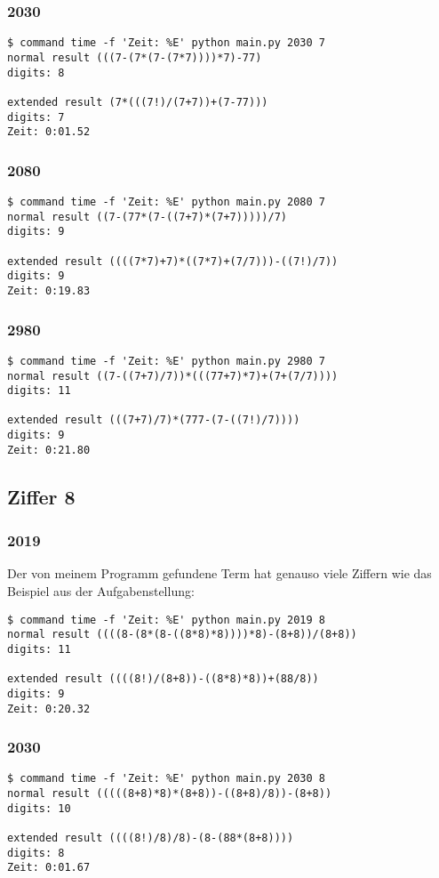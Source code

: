 \subsubsection{2030}
\begin{lstlisting}
$ command time -f 'Zeit: %E' python main.py 2030 7
normal result (((7-(7*(7-(7*7))))*7)-77)
digits: 8

extended result (7*(((7!)/(7+7))+(7-77)))
digits: 7
Zeit: 0:01.52
\end{lstlisting}
\subsubsection{2080}
\begin{lstlisting}
$ command time -f 'Zeit: %E' python main.py 2080 7
normal result ((7-(77*(7-((7+7)*(7+7)))))/7)
digits: 9

extended result ((((7*7)+7)*((7*7)+(7/7)))-((7!)/7))
digits: 9
Zeit: 0:19.83
\end{lstlisting}
\subsubsection{2980}
\begin{lstlisting}
$ command time -f 'Zeit: %E' python main.py 2980 7
normal result ((7-((7+7)/7))*(((77+7)*7)+(7+(7/7))))
digits: 11

extended result (((7+7)/7)*(777-(7-((7!)/7))))
digits: 9
Zeit: 0:21.80
\end{lstlisting}
\subsection{Ziffer 8}
\subsubsection{2019}
Der von meinem Programm gefundene Term hat genauso viele Ziffern wie das Beispiel aus der Aufgabenstellung:
\begin{lstlisting}
$ command time -f 'Zeit: %E' python main.py 2019 8
normal result ((((8-(8*(8-((8*8)*8))))*8)-(8+8))/(8+8))
digits: 11

extended result ((((8!)/(8+8))-((8*8)*8))+(88/8))
digits: 9
Zeit: 0:20.32
\end{lstlisting}
\subsubsection{2030}
\begin{lstlisting}
$ command time -f 'Zeit: %E' python main.py 2030 8
normal result (((((8+8)*8)*(8+8))-((8+8)/8))-(8+8))
digits: 10

extended result ((((8!)/8)/8)-(8-(88*(8+8))))
digits: 8
Zeit: 0:01.67
\end{lstlisting}
